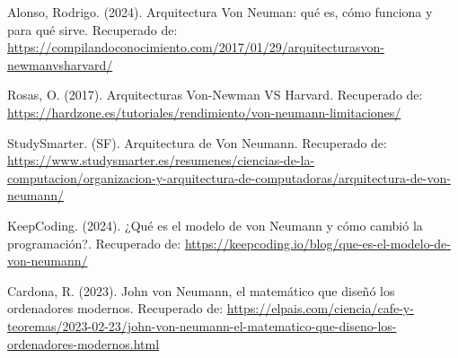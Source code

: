 \documentclass{article}
\begin{document}
\newpage
\begin{thebibliography}{0}
Alonso, Rodrigo. (2024). Arquitectura Von Neuman: qué es, cómo funciona y para qué sirve. Recuperado de: \url{https://compilandoconocimiento.com/2017/01/29/arquitecturasvon-newmanvsharvard/}

Rosas, O. (2017). Arquitecturas Von-Newman VS Harvard. Recuperado de: \url{ https://hardzone.es/tutoriales/rendimiento/von-neumann-limitaciones/}

StudySmarter. (SF). Arquitectura de Von Neumann. Recuperado de: \url{https://www.studysmarter.es/resumenes/ciencias-de-la-computacion/organizacion-y-arquitectura-de-computadoras/arquitectura-de-von-neumann/}

KeepCoding. (2024). ¿Qué es el modelo de von Neumann y cómo cambió la programación?. Recuperado de: \url{https://keepcoding.io/blog/que-es-el-modelo-de-von-neumann/}

Cardona, R. (2023). John von Neumann, el matemático que diseñó los ordenadores modernos. Recuperado de: \url{https://elpais.com/ciencia/cafe-y-teoremas/2023-02-23/john-von-neumann-el-matematico-que-diseno-los-ordenadores-modernos.html}

\end{thebibliography}
\end{document}
